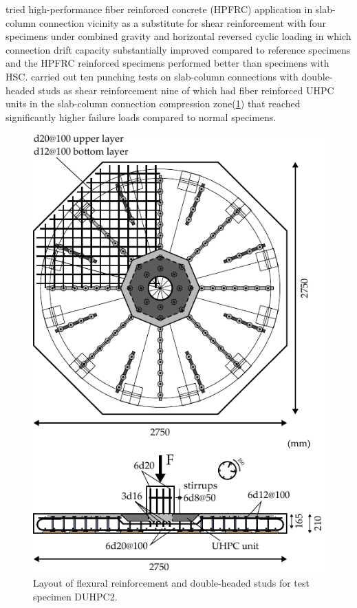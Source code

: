 \documentclass[twocolumn]{article} %
\begin{document}
\cite{ramos2022} tried high-performance fiber reinforced concrete (HPFRC) application in slab-column connection vicinity as a substitute for shear reinforcement with four specimens under combined gravity and horizontal reversed cyclic loading in which connection drift capacity substantially improved compared to reference specimens and the HPFRC reinforced specimens performed better than specimens with HSC. \cite{ricker2017} carried out ten punching tests on slab-column connections with double-headed studs as shear reinforcement nine of which had fiber reinforced UHPC units in the slab-column connection compression zone(\ref{r2017f1}) that reached significantly higher failure loads compared to normal specimens. 
\begin{figure}\centering
    \includegraphics[width=\columnwidth]{Figures/r2017f1.pdf}\caption{Layout of flexural reinforcement and double-headed studs for test specimen DUHPC2\citep{ricker2017}.}\label{r2017f1}
    \end{figure}
\end{document}
